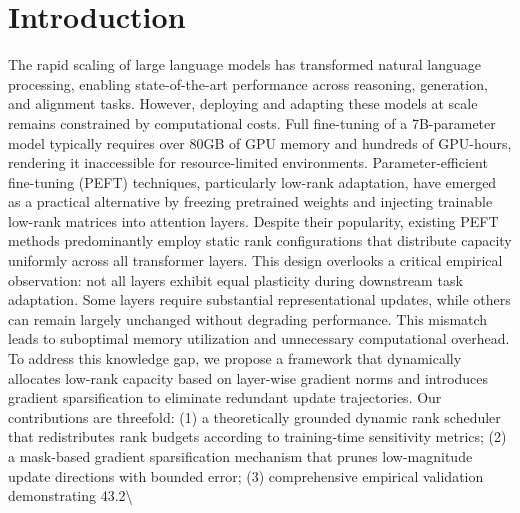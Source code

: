 \documentclass[11pt,a4paper]{article}
\begin{document}
\section{Introduction}
The rapid scaling of large language models has transformed natural language processing, enabling state-of-the-art performance across reasoning, generation, and alignment tasks. However, deploying and adapting these models at scale remains constrained by computational costs. Full fine-tuning of a 7B-parameter model typically requires over 80GB of GPU memory and hundreds of GPU-hours, rendering it inaccessible for resource-limited environments. Parameter-efficient fine-tuning (PEFT) techniques, particularly low-rank adaptation, have emerged as a practical alternative by freezing pretrained weights and injecting trainable low-rank matrices into attention layers. Despite their popularity, existing PEFT methods predominantly employ static rank configurations that distribute capacity uniformly across all transformer layers. This design overlooks a critical empirical observation: not all layers exhibit equal plasticity during downstream task adaptation. Some layers require substantial representational updates, while others can remain largely unchanged without degrading performance. This mismatch leads to suboptimal memory utilization and unnecessary computational overhead. To address this knowledge gap, we propose a framework that dynamically allocates low-rank capacity based on layer-wise gradient norms and introduces gradient sparsification to eliminate redundant update trajectories. Our contributions are threefold: (1) a theoretically grounded dynamic rank scheduler that redistributes rank budgets according to training-time sensitivity metrics; (2) a mask-based gradient sparsification mechanism that prunes low-magnitude update directions with bounded error; (3) comprehensive empirical validation demonstrating 43.2\textbackslash{}%
\end{document}

